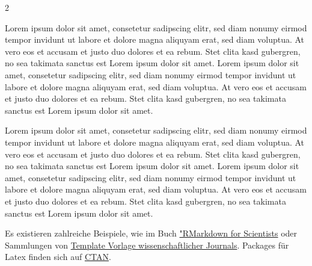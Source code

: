 \documentclass[
  a4paper,
  twoside]{article}
\begin{document}
\begin {multicols}{2}

Lorem ipsum dolor sit amet, consetetur sadipscing elitr, sed diam nonumy eirmod tempor invidunt ut labore et dolore magna aliquyam erat, sed diam voluptua. At vero eos et accusam et justo duo dolores et ea rebum. Stet clita kasd gubergren, no sea takimata sanctus est Lorem ipsum dolor sit amet. Lorem ipsum dolor sit amet, consetetur sadipscing elitr, sed diam nonumy eirmod tempor invidunt ut labore et dolore magna aliquyam erat, sed diam voluptua. At vero eos et accusam et justo duo dolores et ea rebum. Stet clita kasd gubergren, no sea takimata sanctus est Lorem ipsum dolor sit amet.

\columnbreak

Lorem ipsum dolor sit amet, consetetur sadipscing elitr, sed diam nonumy eirmod tempor invidunt ut labore et dolore magna aliquyam erat, sed diam voluptua. At vero eos et accusam et justo duo dolores et ea rebum. Stet clita kasd gubergren, no sea takimata sanctus est Lorem ipsum dolor sit amet. Lorem ipsum dolor sit amet, consetetur sadipscing elitr, sed diam nonumy eirmod tempor invidunt ut labore et dolore magna aliquyam erat, sed diam voluptua. At vero eos et accusam et justo duo dolores et ea rebum. Stet clita kasd gubergren, no sea takimata sanctus est Lorem ipsum dolor sit amet.

\end {multicols}

Es existieren zahlreiche Beispiele, wie im Buch \href{https://rmd4sci.njtierney.com/}{"RMarkdown for Scientists} oder Sammlungen von \href{https://github.com/rstudio/rticles}{Template Vorlage wissenschaftlicher Journals}. Packages für Latex finden sich auf \href{https://www.ctan.org/}{CTAN}.
\end{document}
